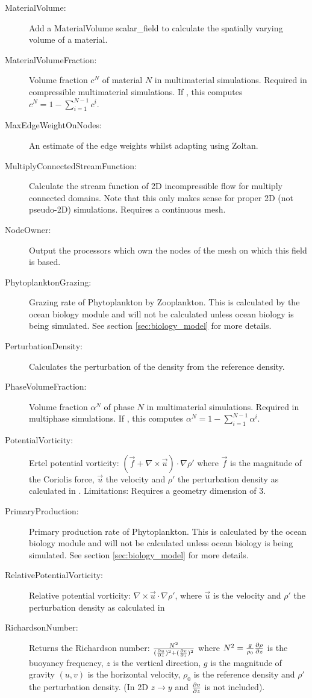\begin{description}
\item[MaterialVolume:]Add a MaterialVolume scalar\_field to calculate the spatially varying volume of a material.
\item[MaterialVolumeFraction:]Volume fraction $c^N$ of material $N$ in multimaterial simulations. Required in compressible multimaterial simulations. If , this computes $c^N = 1 - \sum_{i=1}^{N-1}c^i$.
\item[MaxEdgeWeightOnNodes:]An estimate of the edge weights whilst adapting using Zoltan.
\item[MultiplyConnectedStreamFunction:]Calculate the stream function of 2D incompressible flow for multiply connected domains. Note that this only makes sense for proper 2D (not pseudo-2D) simulations. Requires a continuous mesh.
\item[NodeOwner:]Output the processors which own the nodes of the mesh on which this field is based.   
\item[PhytoplanktonGrazing:]Grazing rate of Phytoplankton by Zooplankton. This is calculated by the ocean biology module and will not be calculated unless ocean biology is being simulated. See section \ref{sec:biology_model} for more details.
\item[PerturbationDensity:]Calculates the perturbation of the density from the reference density.
\item[PhaseVolumeFraction:]Volume fraction $\alpha^N$ of phase $N$ in multimaterial simulations. Required in multiphase simulations. If , this computes $\alpha^N = 1 - \sum_{i=1}^{N-1}\alpha^i$.
\item[PotentialVorticity:]Ertel potential vorticity: $(\vec{f} + \nabla \times \vec{u}) \cdot \nabla \rho'$ where $\vec{f}$ is the magnitude of the Coriolis force, $\vec{u}$ the velocity and $\rho '$ the perturbation density as calculated in .
	Limitations: Requires a geometry dimension of 3. 
\item[PrimaryProduction:]Primary production rate of Phytoplankton. This is calculated by the ocean biology module and will not be calculated unless ocean biology is being simulated.  See section \ref{sec:biology_model} for more details.
\item[RelativePotentialVorticity:]Relative potential vorticity:  $\nabla \times \vec{u} \cdot \nabla \rho'$, where $\vec{u}$ is the velocity and $\rho '$ the perturbation density as calculated in    
\item[RichardsonNumber:]Returns the Richardson number: $\frac{N^2}{(\ppt[z]{u})^2+(\ppx[z]{v})^2}$ where $N^2 = \frac{g}{\rho_0}\ppt[z]{\rho}$ is the buoyancy frequency, $z$ is the vertical direction, $g$ is the magnitude of gravity $(u,v)$ is the horizontal velocity, $\rho_0$ is the reference density and $\rho '$ the perturbation density. (In 2D $z\rightarrow y$ and $\ppx[z]{v}$ is not included). 

\end{description}
